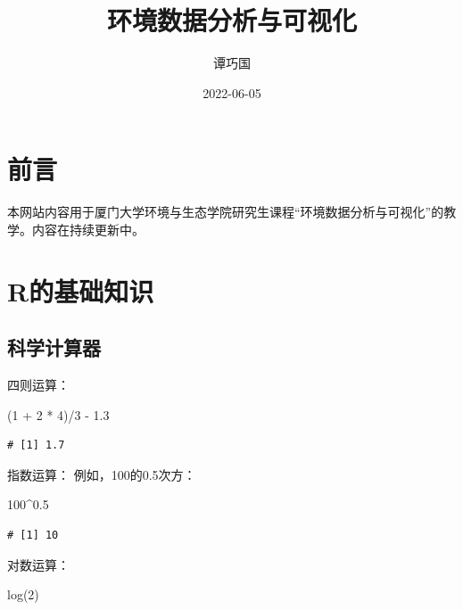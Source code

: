 \documentclass[
]{book}
\title{环境数据分析与可视化}
\author{谭巧国}
\date{2022-06-05}
\newenvironment{Shaded}{\begin{snugshade}}{\end{snugshade}}
\newcommand{\DecValTok}[1]{\textcolor[rgb]{0.00,0.00,0.81}{#1}}
\newcommand{\FloatTok}[1]{\textcolor[rgb]{0.00,0.00,0.81}{#1}}
\newcommand{\FunctionTok}[1]{\textcolor[rgb]{0.00,0.00,0.00}{#1}}
\newcommand{\NormalTok}[1]{#1}
\newcommand{\SpecialCharTok}[1]{\textcolor[rgb]{0.00,0.00,0.00}{#1}}
\begin{document}
\maketitle

{
\setcounter{tocdepth}{1}
\tableofcontents
}
\hypertarget{ux524dux8a00}{%
\chapter*{前言}\label{ux524dux8a00}}

本网站内容用于厦门大学环境与生态学院研究生课程``环境数据分析与可视化''的教学。内容在持续更新中。

\hypertarget{intro}{%
\chapter{R的基础知识}\label{intro}}

\hypertarget{ux79d1ux5b66ux8ba1ux7b97ux5668}{%
\section{科学计算器}\label{ux79d1ux5b66ux8ba1ux7b97ux5668}}

四则运算：

\begin{Shaded}
\begin{Highlighting}[]
\NormalTok{(}\DecValTok{1} \SpecialCharTok{+} \DecValTok{2} \SpecialCharTok{*} \DecValTok{4}\NormalTok{)}\SpecialCharTok{/}\DecValTok{3} \SpecialCharTok{{-}} \FloatTok{1.3}
\end{Highlighting}
\end{Shaded}

\begin{verbatim}
# [1] 1.7
\end{verbatim}

指数运算：
例如，100的0.5次方：

\begin{Shaded}
\begin{Highlighting}[]
\DecValTok{100}\SpecialCharTok{\^{}}\FloatTok{0.5}
\end{Highlighting}
\end{Shaded}

\begin{verbatim}
# [1] 10
\end{verbatim}

对数运算：

\begin{Shaded}
\begin{Highlighting}[]
\FunctionTok{log}\NormalTok{(}\DecValTok{2}\NormalTok{)}
\end{Highlighting}
\end{Shaded}
\end{document}
